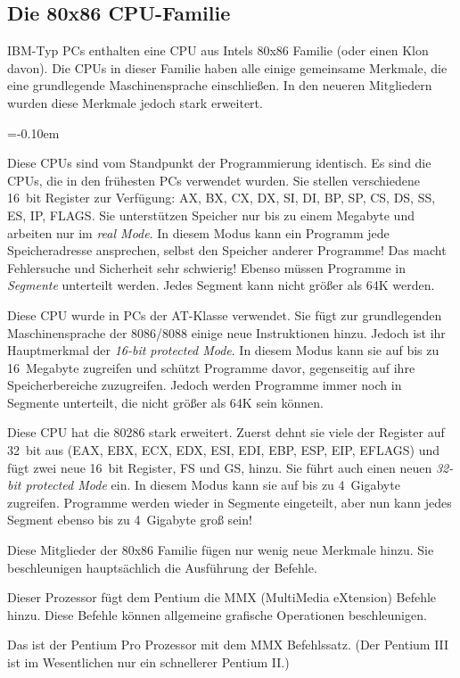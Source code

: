 \subsection{Die 80x86 CPU-Familie}

IBM-Typ PCs enthalten eine CPU aus Intels 80x86 Familie (oder einen
Klon davon). Die CPUs in dieser Familie haben alle einige gemeinsame
Merkmale, die eine grundlegende Maschinensprache einschlie{\ss}en. In
den neueren Mitgliedern wurden diese Merkmale jedoch stark
erweitert.
\begin{description}
\parskip=-0.10em %

\item[8086, 8088:] Diese CPUs sind vom Standpunkt der Programmierung
identisch. Es sind die CPUs, die in den fr\"{u}hesten PCs verwendet
wurden. Sie stellen verschiedene 16~bit Register zur Verf\"{u}gung: AX,
BX, CX, DX, SI, DI, BP, SP, CS, DS, SS, ES, IP, FLAGS\@. Sie
unterst\"{u}tzen Speicher nur bis zu einem Megabyte und arbeiten nur im
\emph{real Mode}. In diesem Modus kann ein Programm jede
Speicheradresse ansprechen, selbst den Speicher anderer Programme!
Das macht Fehlersuche und Sicherheit sehr schwierig! Ebenso m\"{u}ssen
Programme in \emph{Segmente} unterteilt werden. Jedes Segment kann
nicht gr\"{o}{\ss}er als 64K werden.

\item[80286:] Diese CPU wurde in PCs der AT-Klasse verwendet. Sie
f\"{u}gt zur grundlegenden Maschinensprache der 8086/8088 einige neue
Instruktionen hinzu. Jedoch ist ihr Hauptmerkmal der \emph{16-bit
protected Mode}. In diesem Modus kann sie auf bis zu 16~Megabyte
zugreifen und sch\"{u}tzt Programme davor, gegenseitig auf ihre
Speicherbereiche zuzugreifen. Jedoch werden Programme immer noch in
Segmente unterteilt, die nicht gr\"{o}{\ss}er als 64K sein k\"{o}nnen.

\item[80386:] Diese CPU hat die 80286 stark erweitert. Zuerst dehnt
sie viele  der Register auf 32~bit aus (EAX, EBX, ECX, EDX, ESI,
EDI, EBP, ESP, EIP, EFLAGS) und f\"{u}gt zwei neue 16~bit Register, FS
und GS,  hinzu. Sie f\"{u}hrt auch einen neuen
\emph{32-bit protected Mode} ein. In diesem Modus kann sie auf bis
zu 4~Gigabyte zugreifen. Programme werden wieder in Segmente
eingeteilt, aber nun kann jedes Segment ebenso bis zu 4~Gigabyte
gro{\ss} sein!

\item[80486/Pentium/Pentium Pro:] Diese Mitglieder der 80x86 Familie
f\"{u}gen nur wenig neue Merkmale hinzu. Sie beschleunigen haupts\"{a}chlich
die Aus\-f\"{u}h\-rung der Befehle.

\item[Pentium MMX:] Dieser Prozessor f\"{u}gt dem Pentium die MMX
(MultiMedia eXtension) Befehle hinzu. Diese Befehle k\"{o}nnen
allgemeine grafische Operationen beschleunigen.

\item[Pentium II:] Das ist der Pentium Pro Prozessor mit dem MMX
Befehlssatz. (Der Pentium III ist im Wesentlichen nur ein
schnellerer Pentium II.)

\end{description}

